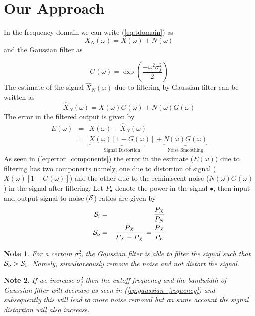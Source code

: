 \documentclass[journal,onecolumn]{IEEEtran}
\newcommand{\Noise}{N}
\newcommand{\Signal}{X}
\newcommand{\g}{f}
\renewcommand{\S}{{\cal S}}
\newtheorem{mynote}{Note}
\begin{document}
\section{Our Approach}
\label{sec:our_approach}

In the frequency domain we can write (\ref{eq:tdomain}) as
 \begin{equation}
\Signal_\Noise(\omega)=\Signal(\omega)+\Noise(\omega)
 \end{equation}
 and the Gaussian filter as

 \begin{equation}
G(\omega)=\exp{\left (\frac{-\omega^2 \sigma_\g^2}{2} \right )}
\label{eq:gaussian_frequency}
 \end{equation} The estimate of the signal 
$\hat{\Signal}_\Noise(\omega)$ due to filtering by Gaussian filter can be
written as
 \begin{equation}
\hat{\Signal}_\Noise(\omega)=\Signal(\omega) G(\omega) + \Noise(\omega) G(\omega)
 \end{equation} The error in the filtered output is given by
 \begin{eqnarray}
E(\omega) &=& \Signal(\omega) - \hat{\Signal}_\Noise(\omega)   \nonumber \\
& = & \underbrace{\Signal(\omega)\left[1-G(\omega)\right]}_{\mbox{Signal
Distortion}} + \underbrace{N(\omega)G(\omega)}_{\mbox{Noise Smoothing}}
\label{eq:error_components}
 \end{eqnarray}
 As seen in (\ref{eq:error_components}) the error in the estimate ($E(\omega)$)
due to 
filtering has two components namely, one due to distortion of signal 
($\Signal(\omega)\left[1-G(\omega)\right]$)
and 
the other due to the reminiscent noise  ($N(\omega)G(\omega)$)
in the signal after filtering. 
Let $P_{\bullet}$ denote the power in the signal $\bullet$, then
input and output signal to noise ($\S$) ratios are given by 
 \begin{eqnarray} 
\S_i & = & \frac{P_\Signal}{P_{\Noise}} \nonumber \\ 
\S_o &= & \frac{P_\Signal}{P_{\Signal} - P_{\hat{\Signal}}} = 
\frac{P_\Signal}{P_{E}}
 \end{eqnarray}
\begin{mynote}
For a certain $\sigma_\g^2$,  the Gaussian filter is able to filter the signal
such that $\S_o > \S_i$. Namely,
simultaneously 
remove the
noise and 
not distort the signal. 
\end{mynote}
\begin{mynote}
If we increase $\sigma_\g^2$ then the cutoff frequency and the 
bandwidth of Gaussian filter will decrease as seen in 
(\ref{eq:gaussian_frequency}) and subsequently this will lead to more 
noise removal but on same account the signal distortion will also increase. 
\end{mynote}
\end{document}

